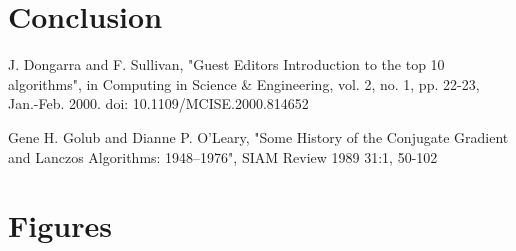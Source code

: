 \iffalse
\subsection{Different Matrices}
For the matrix A dependent on m, the convergence of cg breaks in general.
Since A is not symmetric, the conditions for convergence do not hold.
However, for large values of m, we may still find convergence for the problem.

If m is large, we have "strong" diagonal dominance. 
So we are effectively solving a diagonal system.
b is a constant vector, so x can be approximated by 2.5/a_{ii}.
If m is small, approximately 0, no convergence at all.
How does this play into cg algorithm?

We need symmetry and pos defness for convergence.
May not have set of linearly independent eigenvectors
So the solution will not converge


\fi


\section{Conclusion}

\iffalse
    Conclusion draws together strands of work throughout the report, 
    demonstrating how the results obtained relate to each other and 
    the broader context of the mathematical problem.

Discussion of results in context of problem
Talk about related algorithms
> BiCG
> CG squared
Preconditioning
Parallelisation, optimisations
Results
\fi

\begin{thebibliography}{9}
    
        J. Dongarra and F. Sullivan, 
        "Guest Editors Introduction to the top 10 algorithms",
        in Computing in Science \& Engineering, vol. 2, no. 1, pp. 22-23, Jan.-Feb. 2000.
        doi: 10.1109/MCISE.2000.814652
    
        Gene H. Golub and Dianne P. O’Leary,
        "Some History of the Conjugate Gradient and Lanczos Algorithms: 1948–1976",
        SIAM Review 1989 31:1, 50-102 
        
\end{thebibliography}

\clearpage
\appendix

\section{Figures}

